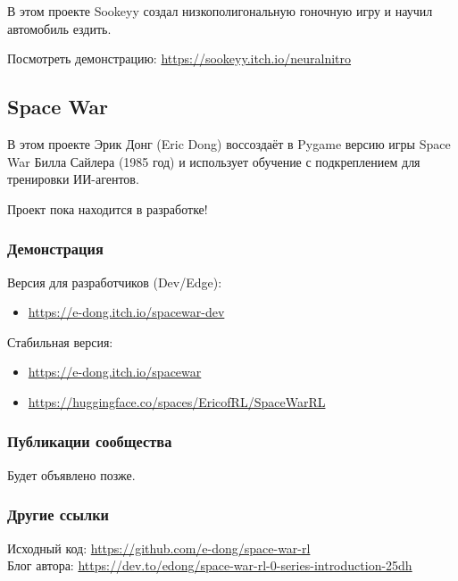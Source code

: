 \documentclass[11pt,a4paper]{article}
\begin{document}
В этом проекте Sookeyy создал низкополигональную гоночную игру и научил автомобиль ездить.

Посмотреть демонстрацию: \url{https://sookeyy.itch.io/neuralnitro}

\subsection{Space War}\label{space-war}


В этом проекте Эрик Донг (Eric Dong) воссоздаёт в Pygame версию игры Space War Билла Сайлера (1985 год) и использует обучение с подкреплением для тренировки ИИ-агентов.

Проект пока находится в разработке!

\subsubsection{Демонстрация}\label{demo}

Версия для разработчиков (Dev/Edge):

\begin{itemize}
\tightlist
\item
  \url{https://e-dong.itch.io/spacewar-dev}
\end{itemize}

Стабильная версия:

\begin{itemize}
\item
  \url{https://e-dong.itch.io/spacewar}
\item
  \url{https://huggingface.co/spaces/EricofRL/SpaceWarRL}
\end{itemize}

\subsubsection{Публикации сообщества}\label{community-blog-posts}

Будет объявлено позже.

\subsubsection{Другие ссылки}\label{other-links}

Исходный код: \url{https://github.com/e-dong/space-war-rl}\\
Блог автора: \url{https://dev.to/edong/space-war-rl-0-series-introduction-25dh}
\end{document}
